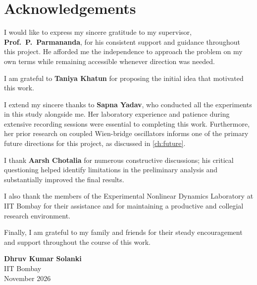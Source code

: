 \chapter*{Acknowledgements}

I would like to express my sincere gratitude to my supervisor, \textbf{Prof.\ P.\ Parmananda}, for his
consistent support and guidance throughout this project. He afforded me the independence to approach the
problem on my own terms while remaining accessible whenever direction was needed.

I am grateful to \textbf{Taniya Khatun} for proposing the initial idea that motivated this work.

I extend my sincere thanks to \textbf{Sapna Yadav}, who conducted all the experiments in this study
alongside me. Her laboratory experience and patience during extensive recording sessions were essential
to completing this work. Furthermore, her prior research on coupled Wien-bridge oscillators informs one
of the primary future directions for this project, as discussed in \cref{ch:future}.

I thank \textbf{Aarsh Chotalia} for numerous constructive discussions; his critical questioning helped
identify limitations in the preliminary analysis and substantially improved the final results.

I also thank the members of the Experimental Nonlinear Dynamics Laboratory at IIT Bombay for their
assistance and for maintaining a productive and collegial research environment.

Finally, I am grateful to my family and friends for their steady encouragement and support throughout
the course of this work.

\vspace{1.5cm}
\hfill\begin{minipage}{6cm}\raggedleft
\textbf{Dhruv Kumar Solanki}\\
IIT Bombay\\
November 2026
\end{minipage}
